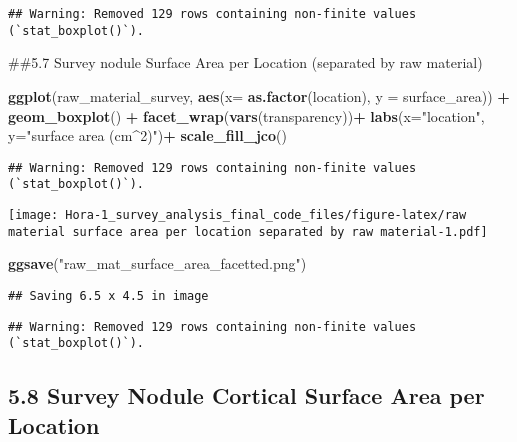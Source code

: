 \documentclass[
]{article}
\newenvironment{Shaded}{\begin{snugshade}}{\end{snugshade}}
\newcommand{\AttributeTok}[1]{\textcolor[rgb]{0.13,0.29,0.53}{#1}}
\newcommand{\FunctionTok}[1]{\textcolor[rgb]{0.13,0.29,0.53}{\textbf{#1}}}
\newcommand{\NormalTok}[1]{#1}
\newcommand{\SpecialCharTok}[1]{\textcolor[rgb]{0.81,0.36,0.00}{\textbf{#1}}}
\newcommand{\StringTok}[1]{\textcolor[rgb]{0.31,0.60,0.02}{#1}}
\begin{document}
\begin{verbatim}
## Warning: Removed 129 rows containing non-finite values (`stat_boxplot()`).
\end{verbatim}

\#\#5.7 Survey nodule Surface Area per Location (separated by raw
material)

\begin{Shaded}
\begin{Highlighting}[]
\FunctionTok{ggplot}\NormalTok{(raw\_material\_survey, }\FunctionTok{aes}\NormalTok{(}\AttributeTok{x=} \FunctionTok{as.factor}\NormalTok{(location), }\AttributeTok{y =}\NormalTok{ surface\_area)) }\SpecialCharTok{+}
  \FunctionTok{geom\_boxplot}\NormalTok{() }\SpecialCharTok{+}
  \FunctionTok{facet\_wrap}\NormalTok{(}\FunctionTok{vars}\NormalTok{(transparency))}\SpecialCharTok{+}
  \FunctionTok{labs}\NormalTok{(}\AttributeTok{x=}\StringTok{"location"}\NormalTok{, }\AttributeTok{y=}\StringTok{"surface area (cm\^{}2)"}\NormalTok{)}\SpecialCharTok{+}
  \FunctionTok{scale\_fill\_jco}\NormalTok{() }
\end{Highlighting}
\end{Shaded}

\begin{verbatim}
## Warning: Removed 129 rows containing non-finite values (`stat_boxplot()`).
\end{verbatim}

\texttt{[image: Hora-1\_survey\_analysis\_final\_code\_files/figure-latex/raw material surface area per location separated by raw material-1.pdf]}

\begin{Shaded}
\begin{Highlighting}[]
\FunctionTok{ggsave}\NormalTok{(}\StringTok{"raw\_mat\_surface\_area\_facetted.png"}\NormalTok{)}
\end{Highlighting}
\end{Shaded}

\begin{verbatim}
## Saving 6.5 x 4.5 in image
\end{verbatim}

\begin{verbatim}
## Warning: Removed 129 rows containing non-finite values (`stat_boxplot()`).
\end{verbatim}

\hypertarget{survey-nodule-cortical-surface-area-per-location}{%
\subsection{5.8 Survey Nodule Cortical Surface Area per
Location}\label{survey-nodule-cortical-surface-area-per-location}}
\end{document}
